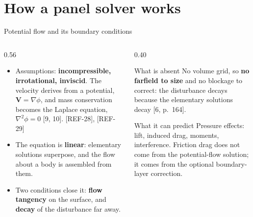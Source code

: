 %
%

\section{How a panel solver works}

\begin{frame}{Potential flow and its boundary conditions}
\begin{columns}[T]
\begin{column}{0.56\textwidth}
\begin{itemize}\small
  \item Assumptions: \textbf{incompressible, irrotational, inviscid}. The
        velocity derives from a potential, \(\mathbf{V} = \nabla\phi\), and
        mass conservation becomes the Laplace equation,
        \(\nabla^2\phi = 0\) [9, 10]. [REF-28], [REF-29]
  \item The equation is \textbf{linear}: elementary solutions superpose, and
        the flow about a body is assembled from them.
  \item Two conditions close it: \textbf{flow tangency} on the surface, and
        \textbf{decay} of the disturbance far away.
\end{itemize}
\end{column}
\begin{column}{0.40\textwidth}
\begin{block}{What is absent}
\small No volume grid, so \textbf{no farfield to size} and no blockage to
correct: the disturbance decays because the elementary solutions decay
[6, p.~164].
\end{block}
\begin{block}{What it can predict}
\small Pressure effects: lift, induced drag, moments, interference. Friction
drag does not come from the potential-flow solution; it comes from the
optional boundary-layer correction.
\end{block}
\end{column}
\end{columns}
\end{frame}

